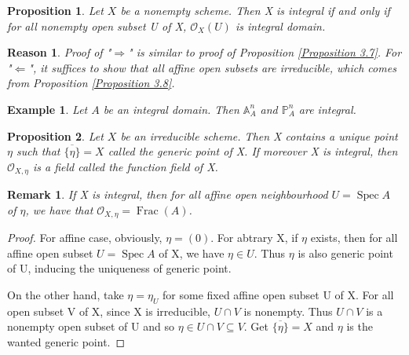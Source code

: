 \documentclass{ctexart}
\newtheorem{remark}{Remark}[section]
\newtheorem{proposition}{Proposition}[section]
\newtheorem{reason}{Reason}[section]
\newtheorem{example}{Example}[section]
\newcommand{\spec}{\operatorname{Spec}}
\newcommand{\fraction}{\operatorname{Frac}}
\begin{document}
\begin{proposition}
    Let $X$ be a nonempty scheme.
    Then X is integral if and only if for all nonempty open subset U of X, $\mathcal{O}_{X}(U)$ is integral domain.
    \label{Proposition 3.9}
\end{proposition}
\begin{reason}
    Proof of "$\Rightarrow$" is similar to proof of Proposition \ref{Proposition 3.7}.
    For "$\Leftarrow$", it suffices to show that all affine open subsets are irreducible, which comes from Proposition \ref{Proposition 3.8}.
\end{reason}
\begin{example}
    Let $A$ be an integral domain.
    Then $\mathbb{A}_{A}^{n}$ and $\mathbb{P}_{A}^{n}$ are integral.
\end{example}
\begin{proposition}
    Let $X$ be an irreducible scheme.
    Then X contains a unique point $\eta$ such that $\overline{\{\eta\}} = X$ called the generic point of X.
    If moreover X is integral, then $\mathcal{O}_{X, \eta}$ is a field called the function field of X.
    \label{Proposition 3.10}
\end{proposition}
\begin{remark}
    If X is integral, then for all affine open neighbourhood $U = \spec A$ of $\eta$, we have that $\mathcal{O}_{X, \eta} = \fraction(A)$. 
\end{remark}
\begin{proof}
    For affine case, obviously, $\eta = (0)$.
    For abtrary X, if $\eta$ exists, then for all affine open subset $U = \spec A$ of X, we have $\eta\in U$.
    Thus $\eta$ is also generic point of U, inducing the uniqueness of generic point.
    \par
    On the other hand, take $\eta = \eta_{U}$ for some fixed affine open subset U of X.
    For all open subset V of X, since X is irreducible, $U \cap V$ is nonempty.
    Thus $U \cap V$ is a nonempty open subset of U and so $\eta\in U \cap V \subseteq V$.
    Get $\overline{\{\eta\}} = X$ and $\eta$ is the wanted generic point.
\end{proof}
\end{document}
